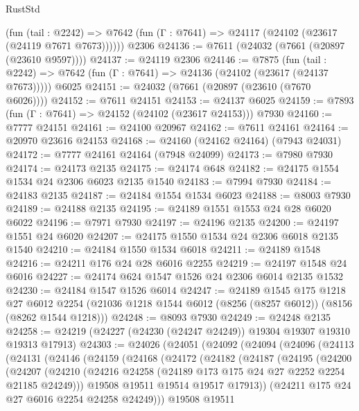 \begin{lexlean}{RustStd}
\begin{coremodule}
{\begin{coremodule}
{{{{{{{{{{{{{{{{{{{{{{{{{{{{{{{{{{      (fun (tail : @2242) =>
      @7642 (fun (Γ : @7641) => @24117 (@24102 (@23617 (@24119 @7671 @7673))))))
    @2306
@24136 := @7611 (@24032 (@7661 (@20897 (@23610 @9597))))
@24137 := @24119 @2306
@24146 := @7875
    (fun (tail : @2242) => @7642 (fun (Γ : @7641) => @24136 (@24102 (@23617 (@24137 @7673)))))
    @6025
@24151 := @24032 (@7661 (@20897 (@23610 (@7670 @6026))))
@24152 := @7611 @24151
@24153 := @24137 @6025
@24159 := @7893 (fun (Γ : @7641) => @24152 (@24102 (@23617 @24153))) @7930
@24160 := @7777 @24151
@24161 := @24100 @20967
@24162 := @7611 @24161
@24164 := @20970 @23616 @24153
@24168 := @24160 (@24162 @24164) (@7943 @24031)
@24172 := @7777 @24161 @24164 (@7948 @24099)
@24173 := @7980 @7930
@24174 := @24173 @2135
@24175 := @24174 @648
@24182 := @24175 @1554 @1534 @24 @2306 @6023 @2135 @1540
@24183 := @7994 @7930
@24184 := @24183 @2135
@24187 := @24184 @1554 @1534 @6023
@24188 := @8003 @7930
@24189 := @24188 @2135
@24195 := @24189 @1551 @1553 @24 @28 @6020 @6022
@24196 := @7971 @7930
@24197 := @24196 @2135
@24200 := @24197 @1551 @24 @6020
@24207 := @24175 @1550 @1534 @24 @2306 @6018 @2135 @1540
@24210 := @24184 @1550 @1534 @6018
@24211 := @24189 @1548
@24216 := @24211 @176 @24 @28 @6016 @2255
@24219 := @24197 @1548 @24 @6016
@24227 := @24174 @624 @1547 @1526 @24 @2306 @6014 @2135 @1532
@24230 := @24184 @1547 @1526 @6014
@24247 := @24189
    @1545
    @175
    @1218
    @27
    @6012
    @2254
    (@21036 @1218 @1544 @6012 (@8256 (@8257 @6012)) (@8156 (@8262 @1544 @1218)))
@24248 := @8093 @7930
@24249 := @24248 @2135
@24258 := @24219 (@24227 (@24230 (@24247 @24249)) @19304 @19307 @19310 @19313 @17913)
@24303 := @24026
    (@24051
      (@24092
        (@24094
          (@24096
            (@24113
              (@24131
                (@24146
                  (@24159
                    (@24168
                      (@24172
                        (@24182
                          (@24187
                            (@24195
                              (@24200
                                (@24207
                                  (@24210
                                    (@24216
                                      @24258
                                      (@24189 @173 @175 @24 @27 @2252 @2254 @21185 @24249)))
                                  @19508
                                  @19511
                                  @19514
                                  @19517
                                  @17913))
                              (@24211 @175 @24 @27 @6016 @2254 @24258 @24249)))
                          @19508
                          @19511
}}}}}}}}}}}}}}}}}}}}}}}}}}}}}}}}}}
\end{coremodule}}
\end{coremodule}
\end{lexlean}
